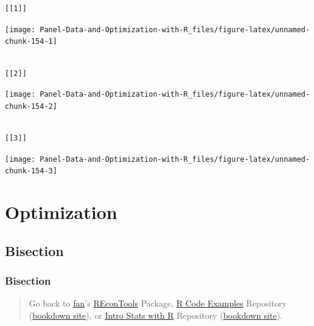 \documentclass[
]{book}
\begin{document}
\begin{verbatim}
[[1]]
\end{verbatim}

\begin{center}\texttt{[image: Panel-Data-and-Optimization-with-R\_files/figure-latex/unnamed-chunk-154-1]} \end{center}

\begin{verbatim}

[[2]]
\end{verbatim}

\begin{center}\texttt{[image: Panel-Data-and-Optimization-with-R\_files/figure-latex/unnamed-chunk-154-2]} \end{center}

\begin{verbatim}

[[3]]
\end{verbatim}

\begin{center}\texttt{[image: Panel-Data-and-Optimization-with-R\_files/figure-latex/unnamed-chunk-154-3]} \end{center}

\hypertarget{optimization}{%
\chapter{Optimization}\label{optimization}}

\hypertarget{bisection}{%
\section{Bisection}\label{bisection}}

\hypertarget{bisection-1}{%
\subsection{Bisection}\label{bisection-1}}

\begin{quote}
Go back to \href{http://fanwangecon.github.io/}{fan}'s \href{https://fanwangecon.github.io/REconTools/}{REconTools} Package, \href{https://fanwangecon.github.io/R4Econ/}{R Code Examples} Repository (\href{https://fanwangecon.github.io/R4Econ/bookdown}{bookdown site}), or \href{https://fanwangecon.github.io/Stat4Econ/}{Intro Stats with R} Repository (\href{https://fanwangecon.github.io/Stat4Econ/bookdown}{bookdown site}).
\end{quote}
\end{document}
